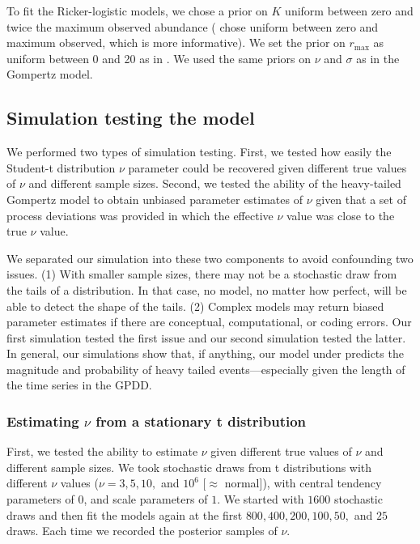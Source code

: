 To fit the Ricker-logistic models, we chose a prior on $K$ uniform between
zero and twice the maximum observed abundance (\citet{clark2010} chose uniform
between zero and maximum observed, which is more informative). We set the
prior on $r_\mathrm{max}$ as uniform between 0 and 20 as in \citet{clark2010}.
We used the same priors on $\nu$ and $\sigma$ as in the Gompertz model.

\subsection{Simulation testing the model}

We performed two types of simulation testing. First, we tested how easily the
Student-t distribution $\nu$ parameter could be recovered given different true
values of $\nu$ and different sample sizes. Second, we tested the ability of
the heavy-tailed Gompertz model to obtain unbiased parameter estimates of
$\nu$ given that a set of process deviations was provided in which the
effective $\nu$ value was close to the true $\nu$ value.

We separated our simulation into these two components to avoid confounding two
issues. (1) With smaller sample sizes, there may not be a stochastic draw from
the tails of a distribution. In that case, no model, no matter how perfect,
will be able to detect the shape of the tails. (2) Complex models may return
biased parameter estimates if there are conceptual, computational, or coding
errors. Our first simulation tested the first issue and our second simulation
tested the latter. In general, our simulations show that, if anything, our
model under predicts the magnitude and probability of heavy tailed
events---especially given the length of the time series in the GPDD.

\subsubsection{Estimating $\nu$ from a stationary t distribution}

First, we tested the ability to estimate $\nu$ given different true values of
$\nu$ and different sample sizes. We took stochastic draws from t
distributions with different $\nu$ values ($\nu = 3, 5, 10,$ and $10^6$
[$\approx$ normal]), with central tendency parameters of $0$, and scale
parameters of $1$. We started with $1600$ stochastic draws and then fit the
models again at the first $800, 400, 200, 100, 50,$ and $25$ draws. Each time
we recorded the posterior samples of $\nu$.

